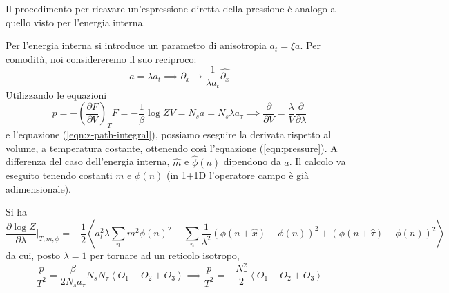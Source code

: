 \documentclass[a4paper,11pt]{article}
\newcommand{\avg}[1]{\left\langle {#1} \right\rangle}
\begin{document}
    Il procedimento per ricavare un'espressione diretta della pressione è analogo a quello visto per l'energia interna.
    
    Per l'energia interna si introduce un parametro di anisotropia $a_t = \xi a$. Per comodità, noi considereremo il suo reciproco:
    \begin{equation}
        a = \lambda a_t \implies \partial_x \to \frac{1}{\lambda a_t} \hat{\partial_x}
    \end{equation}
    Utilizzando le equazioni
    \begin{subequations}
        \begin{equation}
            p = - \left( \frac{\partial F}{\partial V} \right)_T
        \end{equation}
        \begin{equation}
            F = - \frac{1}{\beta} \log Z
        \end{equation}
        \begin{equation}
            V = N_s a = N_s \lambda a_\tau \implies \frac{\partial}{\partial V} = \frac{\lambda}{V} \frac{\partial}{\partial \lambda}
        \end{equation}

    \end{subequations}
    e l'equazione (\ref{eqn:z-path-integral}), possiamo eseguire la derivata rispetto al volume, a temperatura costante, ottenendo così l'equazione (\ref{eqn:pressure}). A differenza del caso dell'energia interna, $\hat{m}$ e $\hat{\phi}(n)$ dipendono da $a$. Il calcolo va eseguito tenendo costanti $m$ e $\phi(n)$ (in 1+1D l'operatore campo è già adimensionale).
    
    Si ha
    \begin{equation}
        \frac{\partial \log Z}{\partial \lambda} \bigg|_{T, m, \phi} = - \frac{1}{2} \avg{ a_t^2 \lambda \sum_n m^2 \phi(n)^2 - \sum_n \frac{1}{\lambda^2} (\phi (n + \hat{x}) - \phi(n))^2 + (\phi(n + \hat{\tau}) - \phi(n))^2}
    \end{equation}
    da cui, posto $\lambda = 1$ per tornare ad un reticolo isotropo,
    \begin{equation}
        \frac{p}{T^2} = \frac{\beta}{2 N_s a_\tau} N_s N_\tau \avg{O_1 - O_2 + O_3} \implies \frac{p}{T^2} = - \frac{N_\tau^2}{2} \avg{O_1 - O_2 + O_3}
    \end{equation}


    
    
\end{document}
